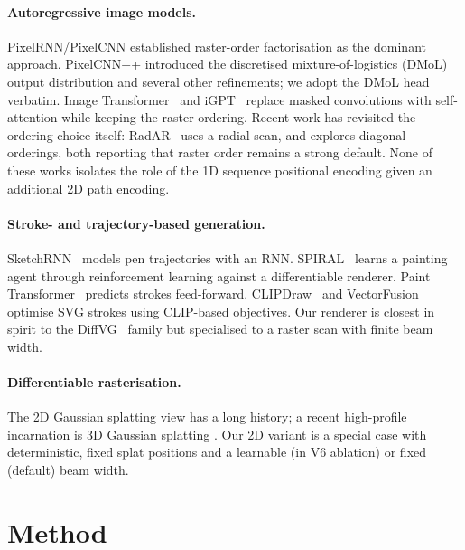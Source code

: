 \documentclass[conference,a4paper]{IEEEtran}
\begin{document}
\paragraph{Autoregressive image models.}
PixelRNN/PixelCNN \cite{vandenoord2016pixelrnn} established raster-order
factorisation as the dominant approach. PixelCNN++
\cite{salimans2017pixelcnnpp} introduced the discretised mixture-of-logistics
(DMoL) output distribution and several other refinements; we adopt the
DMoL head verbatim. Image Transformer~\cite{parmar2018imagetransformer}
and iGPT~\cite{chen2020generative} replace masked convolutions with
self-attention while keeping the raster ordering. Recent work has
revisited the ordering choice itself: RadAR~\cite{li2025radar} uses
a radial scan, and \cite{li2025direction} explores diagonal orderings,
both reporting that raster order remains a strong default. None of
these works isolates the role of the 1D sequence positional
encoding given an additional 2D path encoding.

\paragraph{Stroke- and trajectory-based generation.}
SketchRNN~\cite{ha2017sketchrnn} models pen trajectories with an RNN.
SPIRAL~\cite{ganin2018spiral} learns a painting agent through
reinforcement learning against a differentiable renderer. Paint
Transformer~\cite{liu2021painttransformer} predicts strokes
feed-forward. CLIPDraw~\cite{frans2021clipdraw} and
VectorFusion~\cite{jain2023vectorfusion} optimise SVG strokes using
CLIP-based objectives. Our renderer is closest in spirit to the
DiffVG~\cite{li2020diffvg} family but specialised to a raster
scan with finite beam width.

\paragraph{Differentiable rasterisation.}
The 2D Gaussian splatting view has a long history; a recent
high-profile incarnation is 3D Gaussian splatting
\cite{kerbl20233dgaussian}. Our 2D variant is a special case with
deterministic, fixed splat positions and a learnable (in V6 ablation)
or fixed (default) beam width.

\section{Method}\label{sec:method}
\end{document}
